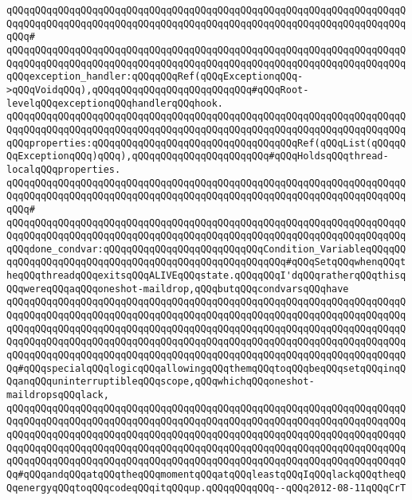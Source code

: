 \verb|qQQqqQQqqQQqqQQqqQQqqQQqqQQqqQQqqQQqqQQqqQQqqQQqqQQqqQQqqQQqqQQqqQQqqQQqqQQqqQQqqQQqqQQqqQQqqQQqqQQqqQQqqQQqqQQqqQQqqQQqqQQqqQQqqQQqqQQqqQQqqQQq#|\newline
\verb|qQQqqQQqqQQqqQQqqQQqqQQqqQQqqQQqqQQqqQQqqQQqqQQqqQQqqQQqqQQqqQQqqQQqqQQqqQQqqQQqqQQqqQQqqQQqqQQqqQQqqQQqqQQqqQQqqQQqqQQqqQQqqQQqqQQqqQQqqQQqqQQqexception_handler:qQQqqQQqRef(qQQqExceptionqQQq->qQQqVoidqQQq),qQQqqQQqqQQqqQQqqQQqqQQqqQQq#qQQqRoot-levelqQQqexceptionqQQqhandlerqQQqhook.|\newline
\verb|qQQqqQQqqQQqqQQqqQQqqQQqqQQqqQQqqQQqqQQqqQQqqQQqqQQqqQQqqQQqqQQqqQQqqQQqqQQqqQQqqQQqqQQqqQQqqQQqqQQqqQQqqQQqqQQqqQQqqQQqqQQqqQQqqQQqqQQqqQQqqQQqproperties:qQQqqQQqqQQqqQQqqQQqqQQqqQQqqQQqqQQqRef(qQQqList(qQQqqQQqExceptionqQQq)qQQq),qQQqqQQqqQQqqQQqqQQqqQQq#qQQqHoldsqQQqthread-localqQQqproperties.|\newline
\verb|qQQqqQQqqQQqqQQqqQQqqQQqqQQqqQQqqQQqqQQqqQQqqQQqqQQqqQQqqQQqqQQqqQQqqQQqqQQqqQQqqQQqqQQqqQQqqQQqqQQqqQQqqQQqqQQqqQQqqQQqqQQqqQQqqQQqqQQqqQQqqQQq#|\newline
\verb|qQQqqQQqqQQqqQQqqQQqqQQqqQQqqQQqqQQqqQQqqQQqqQQqqQQqqQQqqQQqqQQqqQQqqQQqqQQqqQQqqQQqqQQqqQQqqQQqqQQqqQQqqQQqqQQqqQQqqQQqqQQqqQQqqQQqqQQqqQQqqQQqdone_condvar:qQQqqQQqqQQqqQQqqQQqqQQqqQQqCondition_VariableqQQqqQQqqQQqqQQqqQQqqQQqqQQqqQQqqQQqqQQqqQQqqQQqqQQqqQQq#qQQqSetqQQqwhenqQQqtheqQQqthreadqQQqexitsqQQqALIVEqQQqstate.qQQqqQQqI'dqQQqratherqQQqthisqQQqwereqQQqaqQQqoneshot-maildrop,qQQqbutqQQqcondvarsqQQqhave|\newline
\verb|qQQqqQQqqQQqqQQqqQQqqQQqqQQqqQQqqQQqqQQqqQQqqQQqqQQqqQQqqQQqqQQqqQQqqQQqqQQqqQQqqQQqqQQqqQQqqQQqqQQqqQQqqQQqqQQqqQQqqQQqqQQqqQQqqQQqqQQqqQQqqQQqqQQqqQQqqQQqqQQqqQQqqQQqqQQqqQQqqQQqqQQqqQQqqQQqqQQqqQQqqQQqqQQqqQQqqQQqqQQqqQQqqQQqqQQqqQQqqQQqqQQqqQQqqQQqqQQqqQQqqQQqqQQqqQQqqQQqqQQqqQQqqQQqqQQqqQQqqQQqqQQqqQQqqQQqqQQqqQQqqQQqqQQqqQQqqQQqqQQqqQQqqQQqqQQq#qQQqspecialqQQqlogicqQQqallowingqQQqthemqQQqtoqQQqbeqQQqsetqQQqinqQQqanqQQquninterruptibleqQQqscope,qQQqwhichqQQqoneshot-maildropsqQQqlack,|\newline
\verb|qQQqqQQqqQQqqQQqqQQqqQQqqQQqqQQqqQQqqQQqqQQqqQQqqQQqqQQqqQQqqQQqqQQqqQQqqQQqqQQqqQQqqQQqqQQqqQQqqQQqqQQqqQQqqQQqqQQqqQQqqQQqqQQqqQQqqQQqqQQqqQQqqQQqqQQqqQQqqQQqqQQqqQQqqQQqqQQqqQQqqQQqqQQqqQQqqQQqqQQqqQQqqQQqqQQqqQQqqQQqqQQqqQQqqQQqqQQqqQQqqQQqqQQqqQQqqQQqqQQqqQQqqQQqqQQqqQQqqQQqqQQqqQQqqQQqqQQqqQQqqQQqqQQqqQQqqQQqqQQqqQQqqQQqqQQqqQQqqQQqqQQqqQQqqQQq#qQQqandqQQqatqQQqtheqQQqmomentqQQqatqQQqleastqQQqIqQQqlackqQQqtheqQQqenergyqQQqtoqQQqcodeqQQqitqQQqup.qQQqqQQqqQQq--qQQq2012-08-11qQQqCrT|\newline
